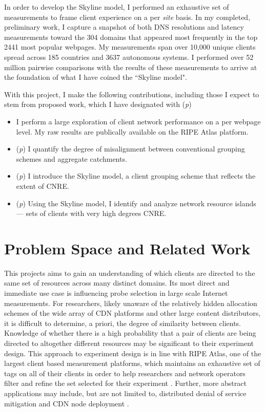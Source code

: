 In order to develop the Skyline model, I performed an exhaustive set of measurements to frame
client experience on a per \emph{site} basis. In my completed, preliminary work, I capture a
snapshot of both DNS resolutions and latency measurements toward the 304 domains that appeared most
frequently in the top 2441 most popular webpages. My measurements span over 10,000 unique
clients spread across 185 countries and 3637 autonomous systems. I performed over 52 million pairwise
comparisons with the results of these measurements to arrive at the foundation of what I have
coined the ``Skyline model". 

With this project, I make the following contributions, including those I expect to stem from
proposed work, which I have designated with (\emph{p})

\begin{itemize}\parskip0pt 
    \item I perform a large exploration of client network performance on a per webpage level. My
        raw results are publically available on the RIPE Atlas platform.
    \item (\emph{p}) I quantify the degree of misalignment between conventional grouping schemes
        and aggregate catchments.
    \item (\emph{p}) I introduce the Skyline model, a client grouping scheme that reflects the
        extent of CNRE.
    \item (\emph{p}) Using the Skyline model, I identify and analyze network resource islands --- 
        sets of clients with very high degrees CNRE. 
\end{itemize}

\section{Problem Space and Related Work} \label{skyspace}

This projects aims to gain an understanding of which clients are directed to the same set of
resources across many distinct domains. Its most direct and immediate use case is influencing probe
selection in large scale Internet measurements. For researchers, likely unaware of the relatively
hidden allocation schemes of the wide array of CDN platforms and other large content distributors,
it is difficult to determine, a priori, the degree of similarity between clients. Knowledge of
whether there is a high probability that a pair of clients are being directed to altogether
different resources may be significant to their experiment design. This approach to experiment
design is in line with RIPE Atlas, one of the largest client based measurement platforms,
which maintains
an exhaustive set of tags on all of their clients in order to help researchers and network operators
filter and refine the set selected for their experiment \cite{ripe-atlas}. Further, more abstract
applications may include, but are not limited to, distributed denial of service mitigation
\cite{anycastvsddos} and CDN node deployment \cite{35590, Tariq}.


